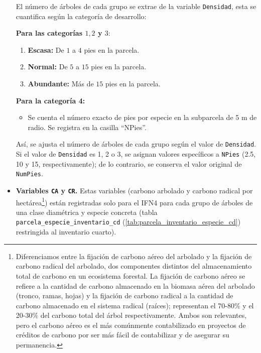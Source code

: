\begin{itemize}
    El número de árboles de cada grupo se extrae de la variable \texttt{Densidad}, esta se cuantifica según la categoría de desarrollo:
    
    \medskip
    
    \textbf{Para las categorías $1, 2$ y $3$}:
    \begin{enumerate}
        \item \textbf{Escasa:} De $1$ a $4$ pies en la parcela.
        \item \textbf{Normal:} De $5$ a $15$ pies en la parcela.
        \item \textbf{Abundante:} Más de $15$ pies en la parcela.    
    \end{enumerate}
    \textbf{Para la categoría 4:}
    \begin{itemize}
        \item Se cuenta el número exacto de pies por especie en la subparcela de 5 m de radio. Se registra en la casilla ``NPies''.
    \end{itemize}
    
    \medskip
    
    Así, se ajusta el número de árboles de cada grupo según el valor de \texttt{Densidad}. Si el valor de \texttt{Densidad} es 1, 2 o 3, se asignan valores específicos a \texttt{NPies} (2.5, 10 y 15, respectivamente); de lo contrario, se conserva el valor original de \texttt{NumPies}.
    
    \medskip

    \item \textbf{Variables \texttt{CA} y \texttt{CR}.} Estas variables (carbono arbolado y carbono radical por hectárea\footnote{Diferenciamos entre la fijación de carbono aéreo del arbolado y la fijación de carbono radical del arbolado, dos componentes distintos del almacenamiento total de carbono en un ecosistema forestal. La fijación de carbono aéreo se refiere a la cantidad de carbono almacenado en la biomasa aérea del arbolado (tronco, ramas, hojas) y la fijación de carbono radical a la cantidad de carbono almacenado en el sistema radical (raíces); representan el 70-80\% y el 20-30\% del carbono total del árbol respectivamente. Ambos son relevantes, pero el carbono aéreo es el más comúnmente contabilizado en proyectos de créditos de carbono por ser más fácil de contabilizar y de asegurar su permanencia. }) están registradas solo para el IFN4 para cada grupo de árboles de una clase diamétrica y especie concreta (tabla \texttt{parcela\_especie\_inventario\_cd} (\ref{tab:parcela_inventario_especie_cd}) restringida al inventario cuarto).
    \medskip


\end{itemize}
